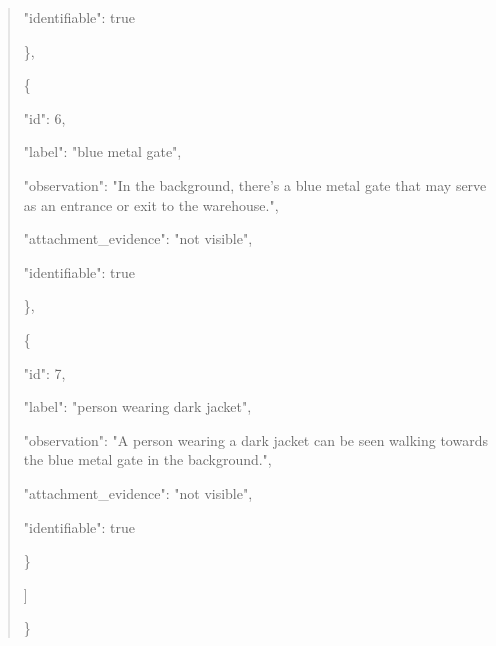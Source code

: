 \documentclass[10pt,a4paper]{article}
\begin{document}
\begin{quote}
      "identifiable":\allowbreak{} true\par
    \},\allowbreak{}\par
    \{\par
      "id":\allowbreak{} 6,\allowbreak{}\par
      "label":\allowbreak{} "blue metal gate",\allowbreak{}\par
      "observation":\allowbreak{} "In the background,\allowbreak{} there's a blue metal gate that may serve as an entrance or exit to the warehouse.",\allowbreak{}\par
      "attachment\_evidence":\allowbreak{} "not visible",\allowbreak{}\par
      "identifiable":\allowbreak{} true\par
    \},\allowbreak{}\par
    \{\par
      "id":\allowbreak{} 7,\allowbreak{}\par
      "label":\allowbreak{} "person wearing dark jacket",\allowbreak{}\par
      "observation":\allowbreak{} "A person wearing a dark jacket can be seen walking towards the blue metal gate in the background.",\allowbreak{}\par
      "attachment\_evidence":\allowbreak{} "not visible",\allowbreak{}\par
      "identifiable":\allowbreak{} true\par
    \}\par
  ]\par
\}
\end{quote}
\end{document}
